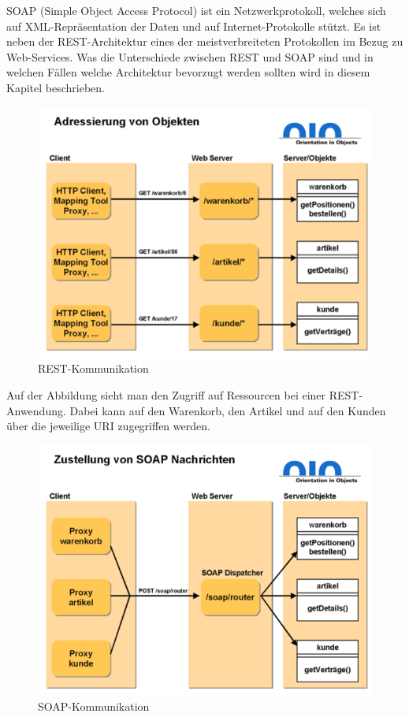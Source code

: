 \pagebreak


SOAP (Simple Object Access Protocol) ist ein Netzwerkprotokoll, welches sich auf XML-Repräsentation der Daten und auf Internet-Protokolle stützt. Es ist neben der REST-Architektur eines der meistverbreiteten Protokollen im Bezug zu Web-Services. Was die Unterschiede zwischen REST und SOAP sind und in welchen Fällen welche Architektur bevorzugt werden sollten wird in diesem Kapitel beschrieben. 

\begin{figure}[H]
    \centering
    \includegraphics{media/REST/restcomm.png}
    \caption{REST-Kommunikation \cite{RestSoap}}
\end{figure}

Auf der Abbildung sieht man den Zugriff auf Ressourcen bei einer REST-Anwendung. Dabei kann auf den Warenkorb, den Artikel und auf den Kunden über die jeweilige URI zugegriffen werden. 

\begin{figure}[H]
    \centering
    \includegraphics{media/REST/soapcomm.png}
    \caption{SOAP-Kommunikation \cite{RestSoap}}
\end{figure}

